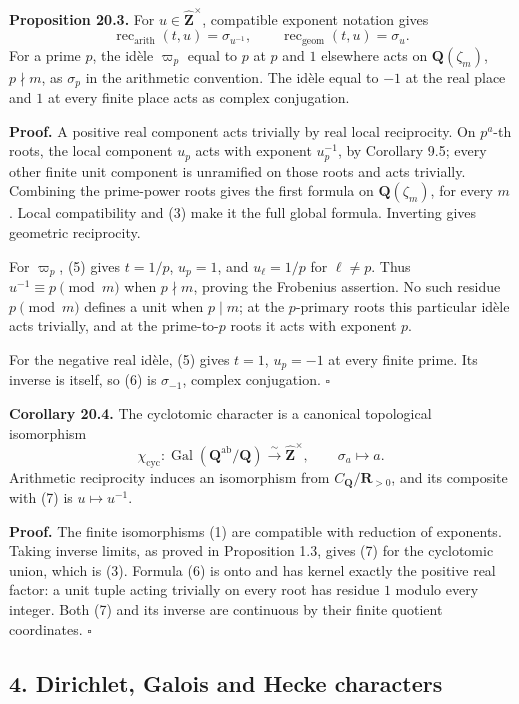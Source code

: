 \documentclass[11pt,a4paper]{article}
\begin{document}
\textbf{Proposition 20.3.} For \(u\in\widehat{\mathbf Z}^{\times}\),
compatible exponent notation gives \[
\operatorname{rec}_{\mathrm{arith}}(t,u)=\sigma_{u^{-1}},
\qquad
\operatorname{rec}_{\mathrm{geom}}(t,u)=\sigma_u.
\tag{6}
\] For a prime \(p\), the idèle \(\varpi_p\) equal to \(p\) at \(p\) and
\(1\) elsewhere acts on \(\mathbf Q(\zeta_m)\), \(p\nmid m\), as
\(\sigma_p\) in the arithmetic convention. The idèle equal to \(-1\) at
the real place and \(1\) at every finite place acts as complex
conjugation.

\textbf{Proof.} A positive real component acts trivially by real local
reciprocity. On \(p^a\)-th roots, the local component \(u_p\) acts with
exponent \(u_p^{-1}\), by Corollary 9.5; every other finite unit
component is unramified on those roots and acts trivially. Combining the
prime-power roots gives the first formula on \(\mathbf Q(\zeta_m)\), for
every \(m\). Local compatibility and (3) make it the full global
formula. Inverting gives geometric reciprocity.

For \(\varpi_p\), (5) gives \(t=1/p\), \(u_p=1\), and \(u_\ell=1/p\) for
\(\ell\ne p\). Thus \(u^{-1}\equiv p\pmod m\) when \(p\nmid m\), proving
the Frobenius assertion. No such residue \(p\pmod m\) defines a unit
when \(p\mid m\); at the \(p\)-primary roots this particular idèle acts
trivially, and at the prime-to-\(p\) roots it acts with exponent \(p\).

For the negative real idèle, (5) gives \(t=1\), \(u_p=-1\) at every
finite prime. Its inverse is itself, so (6) is \(\sigma_{-1}\), complex
conjugation. \(\square\)

\textbf{Corollary 20.4.} The cyclotomic character is a canonical
topological isomorphism \[
\chi_{\mathrm{cyc}}:\operatorname{Gal}(\mathbf Q^{\mathrm{ab}}/\mathbf Q)
\xrightarrow{\sim}\widehat{\mathbf Z}^{\times},
\qquad \sigma_a\longmapsto a.
\tag{7}
\] Arithmetic reciprocity induces an isomorphism from
\(C_{\mathbf Q}/\mathbf R_{>0}\), and its composite with (7) is
\(u\mapsto u^{-1}\).

\textbf{Proof.} The finite isomorphisms (1) are compatible with
reduction of exponents. Taking inverse limits, as proved in Proposition
1.3, gives (7) for the cyclotomic union, which is (3). Formula (6) is
onto and has kernel exactly the positive real factor: a unit tuple
acting trivially on every root has residue \(1\) modulo every integer.
Both (7) and its inverse are continuous by their finite quotient
coordinates. \(\square\)

\subsection{4. Dirichlet, Galois and Hecke
characters}\label{dirichlet-galois-and-hecke-characters}
\end{document}
